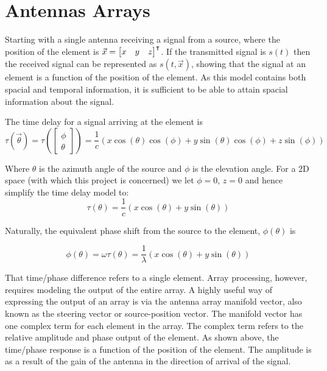 \section{Antennas Arrays}

Starting with a single antenna receiving a signal from a source, where the position of the element is \(\vec{x} = \begin{bmatrix}x & y & z \end{bmatrix}^\intercal\). 
If the transmitted signal is \(s(t)\) then the received signal can be represented as \(s(t, \vec{x})\), showing that the signal at an element is a function of the position of the element.
As this model contains both spacial and temporal information, it is sufficient to be able to attain spacial information about the signal\cite{krim1996two}.

The time delay for a signal arriving at the element is \cite{poisel2012electronic}
\begin{equation}
  \tau(\vec{\theta}) 
 = \tau( \begin{bmatrix} \phi \\ \theta \end{bmatrix} )
 = \frac{1}{c} \left( x\cos(\theta)\cos(\phi) + y\sin(\theta)\cos(\phi) + z\sin(\phi) \right)
\end{equation}

Where \(\theta\) is the azimuth angle of the source and \(\phi\) is the elevation angle.
For a 2D space (with which this project is concerned) we let \(\phi= 0\), \(z = 0\) and hence simplify the time delay model to:
\begin{equation}
  \tau(\theta) = \frac{1}{c} \left( x\cos(\theta) + y\sin(\theta) \right)
\end{equation}

Naturally, the equivalent phase shift from the source to the element, \(\phi(\theta)\) is

\begin{equation}
  \phi(\theta) = \omega\tau(\theta) = \frac{1}{\lambda} \left( x\cos(\theta) + y\sin(\theta) \right)
\end{equation}

That time/phase difference refers to a single element. 
Array processing, however, requires modeling the output of the entire array. 
A highly useful way of expressing the output of an array is via the antenna array manifold vector, also known as the steering vector or source-position vector. 
The manifold vector has one complex term for each element in the array. 
The complex term refers to the relative amplitude and phase output of the element. 
As shown above, the time/phase response is a function of the position of the element. 
The amplitude is as a result of the gain of the antenna in the direction of arrival of the signal. 

